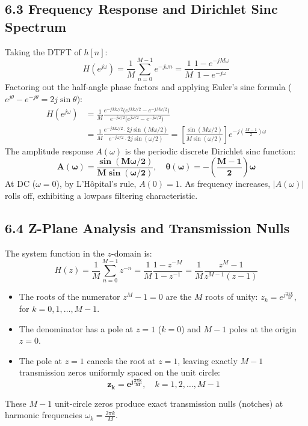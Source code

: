 \documentclass[11pt,a4paper]{article}
\begin{document}
\subsection{6.3 Frequency Response and Dirichlet Sinc Spectrum}
Taking the DTFT of $h[n]$:
\begin{equation}
H(e^{j\omega}) = \frac{1}{M} \sum_{n=0}^{M-1} e^{-j\omega n} = \frac{1}{M} \frac{1 - e^{-j M \omega}}{1 - e^{-j\omega}}
\end{equation}
Factoring out the half-angle phase factors and applying Euler's sine formula ($e^{j\theta} - e^{-j\theta} = 2j\sin\theta$):
\begin{align}
H(e^{j\omega}) &= \frac{1}{M} \frac{e^{-j M \omega / 2}\big(e^{j M \omega / 2} - e^{-j M \omega / 2}\big)}{e^{-j\omega/2}\big(e^{j\omega/2} - e^{-j\omega/2}\big)} \nonumber \\
&= \frac{1}{M} \frac{e^{-j M \omega / 2} \cdot 2j\sin(M\omega/2)}{e^{-j\omega/2} \cdot 2j\sin(\omega/2)} = \left[ \frac{\sin(M\omega/2)}{M\sin(\omega/2)} \right] e^{-j \left(\frac{M-1}{2}\right)\omega}
\end{align}
The amplitude response $A(\omega)$ is the periodic discrete Dirichlet sinc function:
\begin{equation}
\mathbf{A(\omega) = \frac{\sin(M\omega/2)}{M\sin(\omega/2)}}, \quad \mathbf{\theta(\omega) = -\left(\frac{M-1}{2}\right)\omega}
\end{equation}
At DC ($\omega = 0$), by L'Hôpital's rule, $A(0) = 1$. As frequency increases, $|A(\omega)|$ rolls off, exhibiting a lowpass filtering characteristic.

\subsection{6.4 Z-Plane Analysis and Transmission Nulls}
The system function in the $z$-domain is:
\begin{equation}
H(z) = \frac{1}{M} \sum_{n=0}^{M-1} z^{-n} = \frac{1}{M} \frac{1 - z^{-M}}{1 - z^{-1}} = \frac{1}{M} \frac{z^M - 1}{z^{M-1}(z - 1)}
\end{equation}
\begin{itemize}
    \item The roots of the numerator $z^M - 1 = 0$ are the $M$ roots of unity: $z_k = e^{j \frac{2\pi k}{M}}$, for $k = 0, 1, \dots, M-1$.
    \item The denominator has a pole at $z = 1$ ($k=0$) and $M-1$ poles at the origin $z=0$.
    \item The pole at $z=1$ cancels the root at $z=1$, leaving exactly $M-1$ transmission zeros uniformly spaced on the unit circle:
    \begin{equation}
    \mathbf{z_k = e^{j \frac{2\pi k}{M}}}, \quad k = 1, 2, \dots, M-1
    \end{equation}
\end{itemize}
These $M-1$ unit-circle zeros produce exact transmission nulls (notches) at harmonic frequencies $\omega_k = \frac{2\pi k}{M}$.
\end{document}
